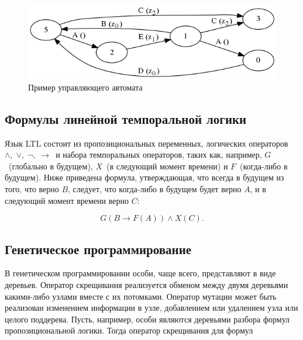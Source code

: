 \documentclass[12pt,fleqn]{article}
\begin{document}
\begin{figure}[!hb]
  \centering
    \includegraphics[scale=0.5]{lift.png}
  \caption{Пример управляющего автомата}
\end{figure}

\subsection{Формулы линейной темпоральной логики}

Язык LTL состоит из пропозициональных переменных, логических операторов $\wedge,\; \vee,\; \lnot,\; \rightarrow$\ и набора
темпоральных операторов, таких как, например, $G$\ (глобально в будущем), $X$\ (в следующий момент времени) и
$F$\ (когда-либо в будущем). Ниже приведена формула, утверждающая, что всегда в будущем из того, что верно $B$, следует,
что когда-либо в будущем будет верно $A$, и в следующий момент времени верно $C$:

$$
G(B \rightarrow F(A)) \wedge X(C).
$$

\subsection{Генетическое программирование}

В генетическом программировании особи, чаще всего, представляют в виде деревьев.
Оператор скрещивания реализуется обменом между двумя деревьями какими-либо узлами вместе с их
потомками. Оператор мутации может быть реализован изменением информации в узле, добавлением или удалением узла
или целого поддерева. Пусть, например, особи являются деревьями разбора формул пропозициональной логики.
Тогда оператор скрещивания для формул

\setcounter{topnumber}{10}
\setcounter{bottomnumber}{10}
\setcounter{totalnumber}{10}

\FloatBarrier
\end{document}

